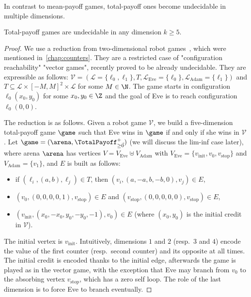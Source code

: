 In contrast to mean-payoff games, total-payoff ones become undecidable in multiple dimensions.

\begin{theorem}
\label{12-thm:TPundec}
Total-payoff games are undecidable in any dimension $k \geq 5$.
\end{theorem}

\begin{proof}
We use a reduction from two-dimensional robot games~\cite{Niskanen&Potapov&Reichert:2016}, which were mentioned in~\cref{chap:counters}. They are a restricted case of "configuration reachability" "vector games", recently proved to be already undecidable. They are expressible as follows: $\mathcal{V} = (\mathcal{L} = \{\ell_0, \ell_1\}, T, \mathcal{L}_{\text{Eve}} = \{\ell_0\}, \mathcal{L}_{\text{Adam}} = \{\ell_1\})$ and $T \subseteq \mathcal{L} \times [-M, M]^2\times \mathcal{L}$ for some $M \in \N$. The game starts in configuration $\ell_0(x_0, y_0)$ for some $x_0, y_0 \in \Z$ and the goal of Eve is to reach configuration $\ell_0(0, 0)$.

The reduction is as follows. Given a robot game $\mathcal{V}$, we build a five-dimension total-payoff game $\game$ such that Eve wins in $\game$ if and only if she wins in $\mathcal{V}$. Let $\game = (\arena, \TotalPayoff^{+}_{\geq \vec{0}})$ (we will discuss the lim-inf case later), where arena $\arena$ has vertices $V = V_{\text{Eve}} \uplus V_{\text{Adam}}$ with $V_{\text{Eve}} = \{v_{\text{init}}, v_0, v_{\text{stop}}\}$ and $V_{\text{Adam}} = \{v_1\}$, and $E$ is built as follows:
\begin{itemize}
\item if $(\ell_i, (a,b), \ell_j) \in T$, then $(v_i, (a, -a, b, -b, 0), v_j) \in E$,
\item $(v_0, (0, 0, 0, 0, 1), v_{\text{stop}}) \in E$ and $(v_{\text{stop}}, (0, 0, 0, 0, 0), v_{\text{stop}}) \in E$,
\item $(v_{\text{init}}, (x_0, -x_0, y_0, -y_0, -1), v_0) \in E$ (where $(x_0, y_0)$ is the initial credit in $\mathcal{V}$).
\end{itemize}
The initial vertex is $v_{\text{init}}$. Intuitively, dimensions $1$ and $2$ (resp.~$3$ and $4$) encode the value of the first counter (resp.~second counter) and its opposite at all times. The initial credit is encoded thanks to the initial edge, afterwards the game is played as in the vector game, with the exception that Eve may branch from $v_0$ to the absorbing vertex $v_{\text{stop}}$, which has a zero self loop. The role of the last dimension is to force Eve to branch eventually.


\end{proof}
